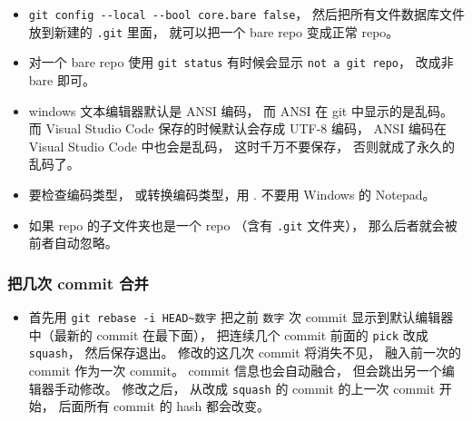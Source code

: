 \begin{itemize}
\item \verb`git config --local --bool core.bare false`， 然后把所有文件数据库文件放到新建的 \verb`.git` 里面， 就可以把一个 bare repo 变成正常 repo。
\item 对一个 bare repo 使用 \verb`git status` 有时候会显示 \verb`not a git repo`， 改成非 bare 即可。
\item windows 文本编辑器默认是 ANSI 编码， 而 ANSI 在 git 中显示的是乱码。 而 Visual Studio Code 保存的时候默认会存成 UTF-8 编码， ANSI 编码在 Visual Studio Code 中也会是乱码， 这时千万不要保存， 否则就成了永久的乱码了。
\item 要检查编码类型， 或转换编码类型，用 . 不要用 Windows 的 Notepad。
\item 如果 repo 的子文件夹也是一个 repo （含有 \verb`.git` 文件夹）， 那么后者就会被前者自动忽略。
\end{itemize}

\subsubsection{把几次 commit 合并}
\begin{itemize}
\item 首先用 \verb`git rebase -i HEAD~数字` 把之前 \verb`数字` 次 commit 显示到默认编辑器中（最新的 commit 在最下面）， 把连续几个 commit 前面的 \verb`pick` 改成 \verb`squash`， 然后保存退出。 修改的这几次 commit 将消失不见， 融入前一次的 commit 作为一次 commit。 commit 信息也会自动融合， 但会跳出另一个编辑器手动修改。 修改之后， 从改成 \verb`squash` 的 commit 的上一次 commit 开始， 后面所有 commit 的 hash 都会改变。
\end{itemize}


